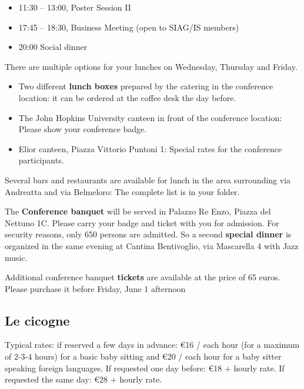 \begin{itemize}
  \item[] 11:30 -- 13:00, Poster Session II
  \item[] 17:45 -- 18:30, Business Meeting (open to SIAG/IS members)
  \item[] 20:00 Social dinner
\end{itemize}

\newpage %
There are multiple options for your lunches on Wednesday, Thursday and Friday. 
\bigskip
\begin{itemize}
  \item Two different \textbf{lunch boxes} prepared by the catering in the conference location: it can be ordered at the coffee desk the day before.
  \item The John Hopkins University canteen in front of the conference location: Please show your conference badge.
  \item Elior canteen, Piazza Vittorio Puntoni 1: Special rates for the conference participants.
\end{itemize}
\bigskip
Several bars and restaurants are available for lunch in the area surrounding via Andreatta and via Belmeloro: The complete list is in your folder.

The \textbf{Conference banquet} will be served in Palazzo Re Enzo, Piazza del Nettuno 1C. Please carry your badge and ticket with you for admission. For security
reasons, only 650 persons are admitted. So a second \textbf{special dinner} is organized in the same evening at Cantina Bentivoglio, via Mascarella 4 with 
Jazz music.

\bigskip 

\noindent Additional conference banquet \textbf{tickets} are available at the price of 65 euros. 
Please purchase it before Friday, June 1 afternoon

\subsection*{Le cicogne} 
Typical rates: if reserved a few days in advance: \euro 16 / each hour (for a maximum of 2-3-4 hours) for a basic baby sitting 
and \euro 20 / each hour for a baby sitter speaking foreign languages.
If requested one day before: \euro 18 + hourly rate.
If requested the same day: \euro 28 + hourly rate.

